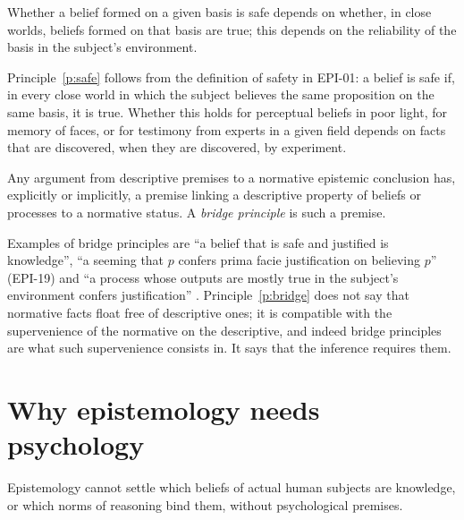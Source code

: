\documentclass{situationist-preprint}
\begin{document}
\begin{principle}\label{p:safe}
Whether a belief formed on a given basis is safe depends on whether, in close worlds, beliefs formed on that basis are true; this depends on the reliability of the basis in the subject's environment.
\end{principle}

Principle~\ref{p:safe} follows from the definition of safety in EPI-01: a belief is safe if, in every close world in which the subject believes the same proposition on the same basis, it is true. Whether this holds for perceptual beliefs in poor light, for memory of faces, or for testimony from experts in a given field depends on facts that are discovered, when they are discovered, by experiment.

\begin{principle}\label{p:bridge}
Any argument from descriptive premises to a normative epistemic conclusion has, explicitly or implicitly, a premise linking a descriptive property of beliefs or processes to a normative status. A \emph{bridge principle} is such a premise.
\end{principle}

Examples of bridge principles are \enquote{a belief that is safe and justified is knowledge}, \enquote{a seeming that $p$ confers prima facie justification on believing $p$} (EPI-19) and \enquote{a process whose outputs are mostly true in the subject's environment confers justification} \citep{Goldman1979}. Principle~\ref{p:bridge} does not say that normative facts float free of descriptive ones; it is compatible with the supervenience of the normative on the descriptive, and indeed bridge principles are what such supervenience consists in. It says that the inference requires them.

\section{Why epistemology needs psychology}

\begin{theorem}\label{t:need}
Epistemology cannot settle which beliefs of actual human subjects are knowledge, or which norms of reasoning bind them, without psychological premises.
\end{theorem}
\end{document}
